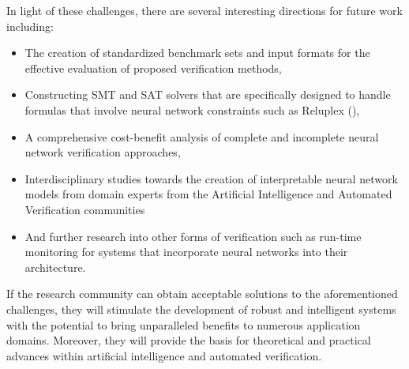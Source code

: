 \documentclass[10pt,conference]{IEEEtran}
\begin{document}
In light of these challenges, there are several interesting directions for future work including:
\begin{itemize}
    \item The creation of standardized benchmark sets and input formats for the effective evaluation of proposed verification methods,
    \item Constructing SMT and SAT solvers that are specifically designed to handle formulas that involve neural network constraints such as Reluplex (\cite{KatzReluplex2017, KuperScalableVerification2018}),
    \item A comprehensive cost-benefit analysis of complete and incomplete neural network verification approaches,
    \item Interdisciplinary studies towards the creation of interpretable neural network models from domain experts from the Artificial Intelligence and Automated Verification communities
    \item And further research into other forms of verification such as run-time monitoring for systems that incorporate neural networks into their architecture. 
\end{itemize}
If the research community can obtain acceptable solutions to the aforementioned challenges, they will stimulate the development of robust and intelligent systems with the potential to bring unparalleled benefits to numerous application domains. Moreover, they will provide the basis for theoretical and practical advances within artificial intelligence and automated verification.










%
\end{document}
